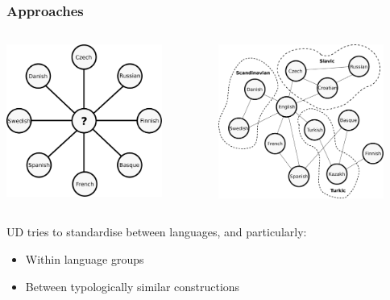 \documentclass[10pt, compress, aspectratio=169]{beamer}
\begin{document}
\begin{frame}
  \frametitle{Approaches}

\begin{center}
\begin{columns}
\includegraphics[width=0.8\textwidth]{images/other-interlingua.eps}

\includegraphics[width=0.85\textwidth]{images/ud-interlingua.eps}

\end{columns}

\end{center}
UD tries to standardise between languages, and particularly:
\begin{itemize}
  \item Within language groups
  \item Between typologically similar constructions
\end{itemize}

\end{frame}
\end{document}
